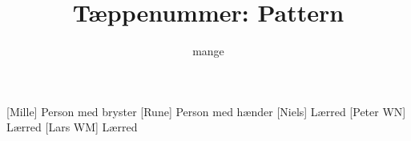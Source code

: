 \documentclass[danish]{article}
\title{Tæppenummer: Pattern}
\author{mange}
\begin{document}
\maketitle

\begin{roles}
  [Mille] Person med bryster
  [Rune] Person med hænder
  [Niels] Lærred
  [Peter WN] Lærred
  [Lars WM] Lærred
\end{roles}

\begin{sketch}

\end{sketch}
\end{document}
